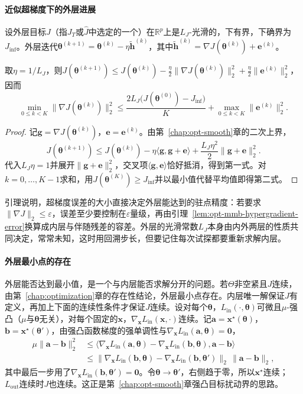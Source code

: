 \paragraph{近似超梯度下的外层进展}
设外层目标$J$（指$J_T$或$\widehat J$中选定的一个）在$\mathbb R^p$上是$L_J$-光滑的，下有界，下确界为$J_{\inf}$。外层迭代$\bm\theta^{(k+1)}=\bm\theta^{(k)}-\eta\tilde{\bm h}^{(k)}$，其中$\tilde{\bm h}^{(k)}=\nabla J(\bm\theta^{(k)})+\bm e^{(k)}$。

\begin{lemma}[近似超梯度的下降]
\label{lem:opt-mmb-inexact-outer}
取$\eta=1/L_J$，则$J(\bm\theta^{(k+1)})\leq J(\bm\theta^{(k)})-\frac\eta2\lVert\nabla J(\bm\theta^{(k)})\rVert_2^2+\frac\eta2\lVert\bm e^{(k)}\rVert_2^2$，因而
\[
\min_{0\leq k<K}\lVert\nabla J(\bm\theta^{(k)})\rVert_2^2\leq\frac{2L_J\bigl(J(\bm\theta^{(0)})-J_{\inf}\bigr)}K+\max_{0\leq k<K}\lVert\bm e^{(k)}\rVert_2^2.
\]
\end{lemma}

\begin{proof}
记$\bm g=\nabla J(\bm\theta^{(k)})$，$\bm e=\bm e^{(k)}$。由第~\ref{chap:opt-smooth}章的二次上界，
\[
J(\bm\theta^{(k+1)})\leq J(\bm\theta^{(k)})-\eta\langle\bm g,\bm g+\bm e\rangle+\frac{L_J\eta^2}2\lVert\bm g+\bm e\rVert_2^2.
\]
代入$L_J\eta=1$并展开$\lVert\bm g+\bm e\rVert_2^2$，交叉项$\langle\bm g,\bm e\rangle$恰好抵消，得到第一式。对$k=0,\dots,K-1$求和，用$J(\bm\theta^{(K)})\geq J_{\inf}$并以最小值代替平均值即得第二式。
\end{proof}

引理说明，超梯度误差的大小直接决定外层能达到的驻点精度：若要求$\lVert\nabla J\rVert_2\leq\varepsilon$，误差至少要控制在$\varepsilon$量级，再由引理~\ref{lem:opt-mmb-hypergradient-error}换算成内层与伴随残差的容差。外层的光滑常数$L_J$本身由内外两层的性质共同决定，常常未知，这时用回溯步长，但要记住每次试探都要重新求解内层。

\paragraph{外层最小点的存在}
外层能否达到最小值，是一个与内层能否求解分开的问题。若$\Theta$非空紧且$J$连续，由第~\ref{chap:optimization}章的存在性结论，外层最小点存在。内层唯一解保证$J$有定义，再加上下面的连续性条件才保证$J$连续。设对每个$\bm\theta$，$L_{\mathrm{in}}(\cdot,\bm\theta)$可微且$\mu$-强凸（$\mu$与$\bm\theta$无关），对每个固定的$\bm x$，$\nabla_{\bm x}L_{\mathrm{in}}(\bm x,\cdot)$连续。记$\bm a=\bm x^\star(\bm\theta)$，$\bm b=\bm x^\star(\bm\theta')$，由强凸函数梯度的强单调性与$\nabla_{\bm x}L_{\mathrm{in}}(\bm a,\bm\theta)=\bm 0$，
\[
\begin{aligned}
\mu\lVert\bm a-\bm b\rVert_2^2&\leq\langle\nabla_{\bm x}L_{\mathrm{in}}(\bm a,\bm\theta)-\nabla_{\bm x}L_{\mathrm{in}}(\bm b,\bm\theta),\bm a-\bm b\rangle\\
&\leq\lVert\nabla_{\bm x}L_{\mathrm{in}}(\bm b,\bm\theta)-\nabla_{\bm x}L_{\mathrm{in}}(\bm b,\bm\theta')\rVert_2\,\lVert\bm a-\bm b\rVert_2,
\end{aligned}
\]
其中最后一步用了$\nabla_{\bm x}L_{\mathrm{in}}(\bm b,\bm\theta')=\bm 0$。令$\bm\theta\to\bm\theta'$，右侧趋于零，所以$\bm x^\star$连续；$L_{\mathrm{out}}$连续时$J$也连续。这正是第~\ref{chap:opt-smooth}章强凸目标扰动界的思路。

